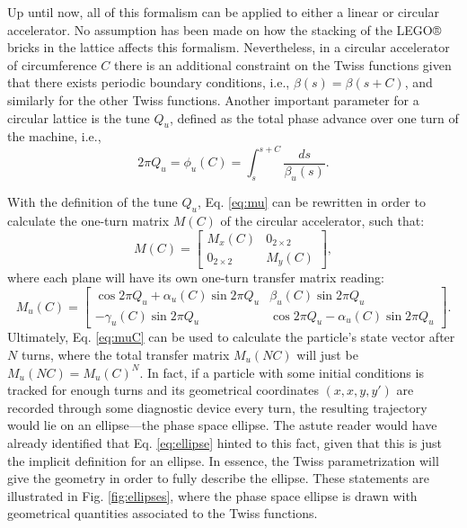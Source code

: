 Up until now, all of this formalism can be applied to either a linear or circular accelerator. No assumption has been made on how the stacking of the LEGO® bricks in the lattice affects this formalism. Nevertheless, in a circular accelerator of circumference $C$ there is an additional constraint on the Twiss functions given that there exists periodic boundary conditions, i.e., $\beta(s)=\beta(s+C)$, and similarly for the other Twiss functions. Another important parameter for a circular lattice is the tune $Q_u$, defined as the total phase advance over one turn of the machine, i.e.,
\begin{equation}
    \label{eq:tune}
    2 \pi Q_u =  \phi_u(C) = \int_s^{s+C}\frac{ds}{\beta_u (s)}. 
\end{equation}

With the definition of the tune $Q_u$, Eq. \ref{eq:mu} can be rewritten in order to calculate the one-turn matrix $M(C)$ of the circular accelerator, such that:
\begin{equation}
    \label{eq:twissmatrixC}
    M(C)= 
    \begin{bmatrix} 
    M_x(C) & 0_{2 \times 2} \\ 
    0_{2 \times 2} & M_y(C)
    \end{bmatrix},
\end{equation}
where each plane will have its own one-turn transfer matrix reading:
\begin{equation}
    \label{eq:muC}
    M_u(C)= 
    \begin{bmatrix} 
        \cos 2\pi Q_u +\alpha_u(C) \sin 2\pi Q_u & \beta_u(C) \sin 2\pi Q_u \\ 
        - \gamma_u(C) \sin 2\pi Q_u & \cos 2 \pi Q_u -\alpha_u(C) \sin 2\pi Q_u
    \end{bmatrix}.
\end{equation}
Ultimately, Eq. \ref{eq:muC} can be used to calculate the particle's state vector after $N$ turns, where the total transfer matrix $M_u(NC)$ will just be $M_u(NC)=M_u(C)^N$. In fact, if a particle with some initial conditions is tracked for enough turns and its geometrical coordinates $\left( x,x,y,y' \right)$ are recorded through some diagnostic device every turn, the resulting trajectory would lie on an ellipse---the phase space ellipse. The astute reader would have already identified that Eq. \ref{eq:ellipse} hinted to this fact, given that this is just the implicit definition for an ellipse. In essence, the Twiss parametrization will give the geometry in order to fully describe the ellipse. These statements are illustrated in Fig. \ref{fig:ellipses}, where the phase space ellipse is drawn with geometrical quantities associated to the Twiss functions.

